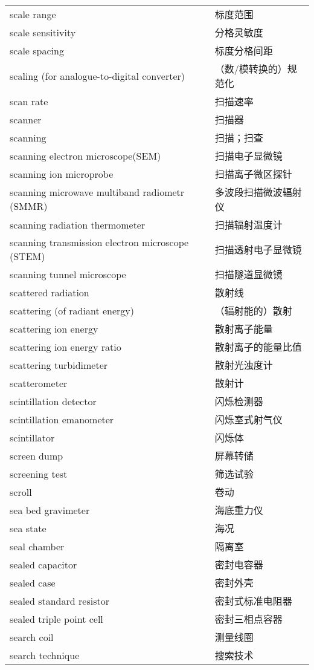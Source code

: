 \documentclass[
]{article}
\begin{document}
\begin{longtable}[]{@{}ll@{}}
scale range & 标度范围 \\
scale sensitivity & 分格灵敏度 \\
scale spacing & 标度分格间距 \\
scaling (for analogue-to-digital converter) & （数/模转换的）规范化 \\
scan rate & 扫描速率 \\
scanner & 扫描器 \\
scanning & 扫描；扫查 \\
scanning electron microscope(SEM) & 扫描电子显微镜 \\
scanning ion microprobe & 扫描离子微区探针 \\
scanning microwave multiband radiometr (SMMR) & 多波段扫描微波辐射仪 \\
scanning radiation thermometer & 扫描辐射温度计 \\
scanning transmission electron microscope (STEM) & 扫描透射电子显微镜 \\
scanning tunnel microscope & 扫描隧道显微镜 \\
scattered radiation & 散射线 \\
scattering (of radiant energy) & （辐射能的）散射 \\
scattering ion energy & 散射离子能量 \\
scattering ion energy ratio & 散射离子的能量比值 \\
scattering turbidimeter & 散射光浊度计 \\
scatterometer & 散射计 \\
scintillation detector & 闪烁检测器 \\
scintillation emanometer & 闪烁室式射气仪 \\
scintillator & 闪烁体 \\
screen dump & 屏幕转储 \\
screening test & 筛选试验 \\
scroll & 卷动 \\
sea bed gravimeter & 海底重力仪 \\
sea state & 海况 \\
seal chamber & 隔离室 \\
sealed capacitor & 密封电容器 \\
sealed case & 密封外壳 \\
sealed standard resistor & 密封式标准电阻器 \\
sealed triple point cell & 密封三相点容器 \\
search coil & 测量线圈 \\
search technique & 搜索技术 \\

\end{longtable}
\end{document}
